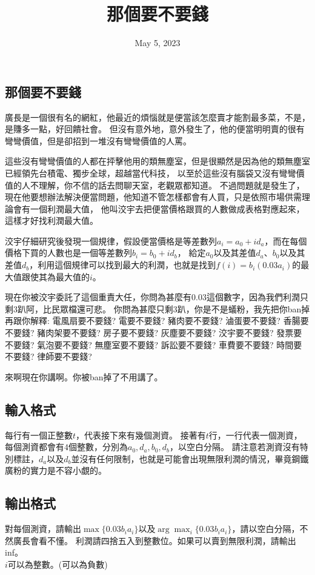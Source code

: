 \documentclass{article}
\title{那個要不要錢}
\date{May 5, 2023}
\begin{document}
\begin{CJK*}{UTF8}{bsmi}

\maketitle

\section*{那個要不要錢}
廣長是一個很有名的網紅，他最近的煩惱就是便當該怎麼賣才能割最多菜，不是，是賺多一點，好回饋社會。
但沒有意外地，意外發生了，他的便當明明賣的很有彎彎價值，但是卻招到一堆沒有彎彎價值的人罵。

這些沒有彎彎價值的人都在抨擊他用的類無塵室，但是很顯然是因為他的類無塵室已經領先台積電、獨步全球，超越當代科技，
以至於這些沒有腦袋又沒有彎彎價值的人不理解，你不信的話去問聊天室，老觀眾都知道。
不過問題就是發生了，現在他要想辦法解決便當問題，他知道不管怎樣都會有人買，只是依照市場供需理論會有一個利潤最大值，
他叫洨宇去把便當價格跟買的人數做成表格對應起來，這樣才好找利潤最大值。

洨宇仔細研究後發現一個規律，假設便當價格是等差數列$a_i=a_0+id_a$，而在每個價格下買的人數也是一個等差數列$b_i=b_0+id_b$，
給定$a_0$以及其差值$d_a$、$b_0$以及其差值$d_b$，利用這個規律可以找到最大的利潤，也就是找到$f(i)=b_i(0.03a_i)$的最大值跟使其為最大值的$i$。

現在你被洨宇委託了這個重責大任，你問為甚麼有$0.03$這個數字，因為我們利潤只剩$3$趴阿，比民眾檔還可悲。
你問為甚麼只剩$3$趴，你是不是蟻粉，我先把你ban掉再跟你解釋:
電風扇要不要錢? 電要不要錢? 豬肉要不要錢? 滷蛋要不要錢? 香腸要不要錢? 豬肉架要不要錢? 房子要不要錢? 灰塵要不要錢? 
洨宇要不要錢? 發票要不要錢? 氣泡要不要錢? 無塵室要不要錢? 訴訟要不要錢? 車費要不要錢? 時間要不要錢? 律師要不要錢?

來啊現在你講啊。你被ban掉了不用講了。

\subsection*{輸入格式}
每行有一個正整數$t$，代表接下來有幾個測資。
接著有$t$行，一行代表一個測資，每個測資都會有$4$個整數，分別為$a_0,d_a,b_0,d_b$，以空白分隔。
請注意若測資沒有特別標註，$d_a$以及$d_b$並沒有任何限制，也就是可能會出現無限利潤的情況，畢竟鋼鐵廣粉的實力是不容小覷的。

\subsection*{輸出格式}
對每個測資，請輸出$\max\{0.03b_ia_i\}$以及$\arg\max_i\{0.03b_ia_i\}$，請以空白分隔，不然廣長會看不懂。
利潤請四捨五入到整數位。如果可以賣到無限利潤，請輸出inf。\\
$i$可以為整數。(可以為負數)


\end{CJK*}
\end{document}
